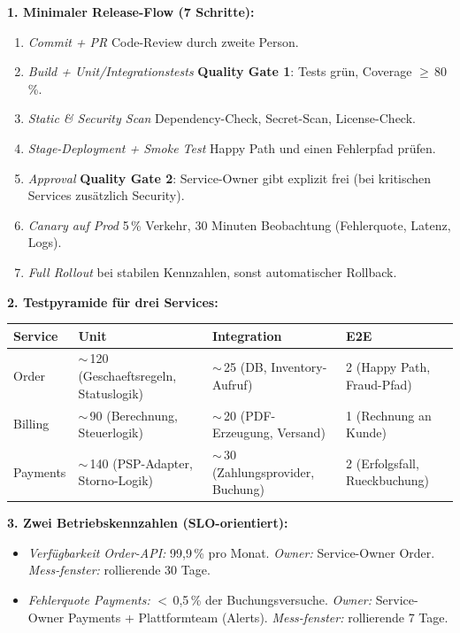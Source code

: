 \documentclass[11pt,a4paper,oneside]{article}
\begin{document}
\begin{loesungbox}
\textbf{1. Minimaler Release-Flow (7 Schritte):}
\begin{enumerate}
  \item \emph{Commit + PR} \textendash{} Code-Review durch zweite Person.
  \item \emph{Build + Unit/Integrationstests} \textendash{} \textbf{Quality Gate 1}: Tests gr\"un, Coverage $\geq$\,80\,\%.
  \item \emph{Static \& Security Scan} \textendash{} Dependency-Check, Secret-Scan, License-Check.
  \item \emph{Stage-Deployment + Smoke Test} \textendash{} Happy Path und einen Fehlerpfad pr\"ufen.
  \item \emph{Approval} \textendash{} \textbf{Quality Gate 2}: Service-Owner gibt explizit frei (bei kritischen Services zus\"atzlich Security).
  \item \emph{Canary auf Prod} \textendash{} 5\,\% Verkehr, 30 Minuten Beobachtung (Fehlerquote, Latenz, Logs).
  \item \emph{Full Rollout} bei stabilen Kennzahlen, sonst automatischer Rollback.
\end{enumerate}

\smallskip
\textbf{2. Testpyramide f\"ur drei Services:}

\smallskip
\begin{tabularx}{\linewidth}{@{}lXXX@{}}
\toprule
\textbf{Service} & \textbf{Unit} & \textbf{Integration} & \textbf{E2E} \\
\midrule
Order   & $\sim$\,120 (Geschaeftsregeln, Statuslogik) & $\sim$\,25 (DB, Inventory-Aufruf)  & 2 (Happy Path, Fraud-Pfad) \\
Billing & $\sim$\,90 (Berechnung, Steuerlogik)        & $\sim$\,20 (PDF-Erzeugung, Versand) & 1 (Rechnung an Kunde) \\
Payments & $\sim$\,140 (PSP-Adapter, Storno-Logik)    & $\sim$\,30 (Zahlungsprovider, Buchung) & 2 (Erfolgsfall, Rueckbuchung) \\
\bottomrule
\end{tabularx}

\smallskip
\textbf{3. Zwei Betriebskennzahlen (SLO-orientiert):}
\begin{itemize}
  \item \emph{Verf\"ugbarkeit Order-API:} 99,9\,\% pro Monat. \emph{Owner:} Service-Owner Order. \emph{Mess-fenster:} rollierende 30 Tage.
  \item \emph{Fehlerquote Payments:} $<$\,0,5\,\% der Buchungsversuche. \emph{Owner:} Service-Owner Payments + Plattformteam (Alerts). \emph{Mess-fenster:} rollierende 7 Tage.
\end{itemize}


\end{loesungbox}
\end{document}
